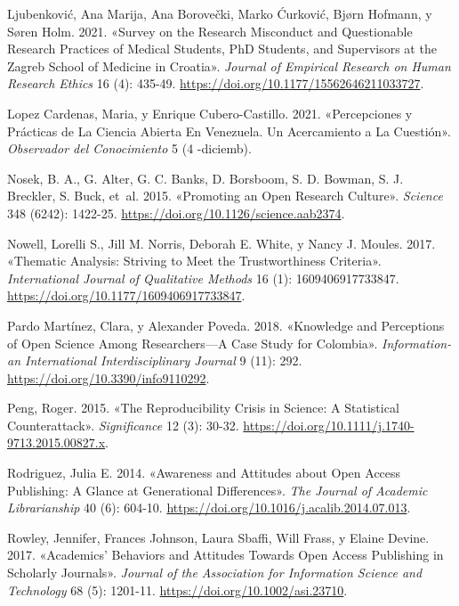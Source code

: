 \documentclass[
  letterpaper,
  DIV=11,
  numbers=noendperiod]{scrreprt}
\newlength{\cslhangindent}
\newlength{\cslentryspacingunit} %
\newenvironment{CSLReferences}[2] %
 {%
  \setlength{\parindent}{0pt}
  \ifodd #1
  \let\oldpar\par
  \def\par{\hangindent=\cslhangindent\oldpar}
  \fi
  \setlength{\parskip}{#2\cslentryspacingunit}
 }%
 {}
\begin{document}
\begin{CSLReferences}{1}{0}
\leavevmode{}%
Ljubenković, Ana Marija, Ana Borovečki, Marko Ćurković, Bjørn Hofmann, y
Søren Holm. 2021. {«Survey on the {Research Misconduct} and
{Questionable Research Practices} of {Medical Students}, {PhD Students},
and {Supervisors} at the {Zagreb School} of {Medicine} in {Croatia}»}.
\emph{Journal of Empirical Research on Human Research Ethics} 16 (4):
435-49. \url{https://doi.org/10.1177/15562646211033727}.

\leavevmode{}%
Lopez Cardenas, Maria, y Enrique Cubero-Castillo. 2021. {«Percepciones y
Pr{á}cticas de La Ciencia Abierta En {Venezuela}. {Un} Acercamiento a La
Cuesti{ó}n»}. \emph{Observador del Conocimiento} 5 (4 -diciemb).

\leavevmode{}%
Nosek, B. A., G. Alter, G. C. Banks, D. Borsboom, S. D. Bowman, S. J.
Breckler, S. Buck, et~al. 2015. {«Promoting an Open Research Culture»}.
\emph{Science} 348 (6242): 1422-25.
\url{https://doi.org/10.1126/science.aab2374}.

\leavevmode{}%
Nowell, Lorelli S., Jill M. Norris, Deborah E. White, y Nancy J. Moules.
2017. {«Thematic {Analysis}: {Striving} to {Meet} the {Trustworthiness
Criteria}»}. \emph{International Journal of Qualitative Methods} 16 (1):
1609406917733847. \url{https://doi.org/10.1177/1609406917733847}.

\leavevmode{}%
Pardo Martínez, Clara, y Alexander Poveda. 2018. {«Knowledge and
{Perceptions} of {Open Science} Among {Researchers}---{A Case Study} for
{Colombia}»}. \emph{Information-an International Interdisciplinary
Journal} 9 (11): 292. \url{https://doi.org/10.3390/info9110292}.

\leavevmode{}%
Peng, Roger. 2015. {«The Reproducibility Crisis in Science: {A}
Statistical Counterattack»}. \emph{Significance} 12 (3): 30-32.
\url{https://doi.org/10.1111/j.1740-9713.2015.00827.x}.

\leavevmode{}%
Rodriguez, Julia E. 2014. {«Awareness and {Attitudes} about {Open Access
Publishing}: {A Glance} at {Generational Differences}»}. \emph{The
Journal of Academic Librarianship} 40 (6): 604-10.
\url{https://doi.org/10.1016/j.acalib.2014.07.013}.

\leavevmode{}%
Rowley, Jennifer, Frances Johnson, Laura Sbaffi, Will Frass, y Elaine
Devine. 2017. {«Academics' Behaviors and Attitudes Towards Open Access
Publishing in Scholarly Journals»}. \emph{Journal of the Association for
Information Science and Technology} 68 (5): 1201-11.
\url{https://doi.org/10.1002/asi.23710}.


\end{CSLReferences}
\end{document}
